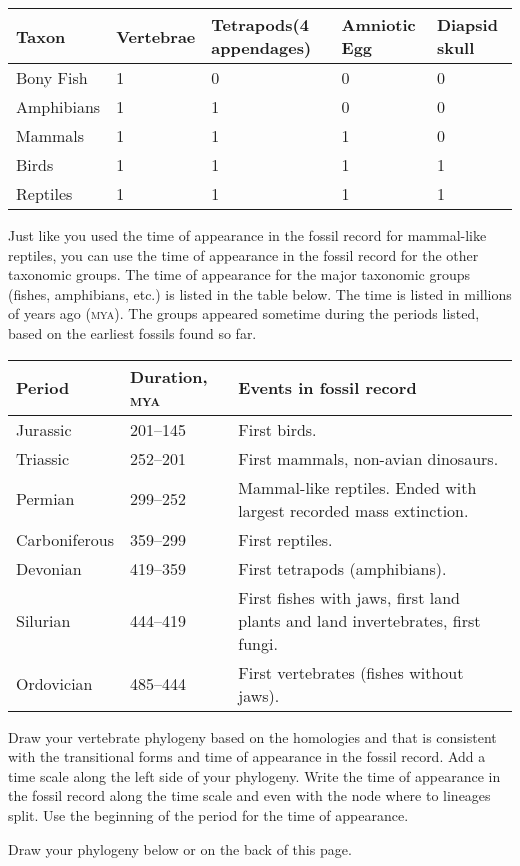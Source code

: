 \documentclass[12pt, hidelinks]{exam}
\begin{document}
\begin{questions}
\begin{longtable}[c]{@{}L{1in}C{1in}C{1in}C{1in}C{1in}@{}}
	\toprule
	Taxon 				&	Vertebrae	& Tetrapods\newline(4 appendages)	&	Amniotic Egg	& Diapsid skull \tabularnewline
	\midrule
	Bony Fish			& 1				&	0							& 0 						& 0 \tabularnewline
	Amphibians		& 1				&	1							& 0 						& 0 \tabularnewline
	Mammals			& 1				&	1							& 1 						& 0 \tabularnewline
	Birds					& 1				&	1							& 1 						& 1 \tabularnewline
	Reptiles			& 1				&	1							& 1 						& 1 \tabularnewline
	\bottomrule
\end{longtable}

\newpage

Just like you used the time of appearance in the fossil record for mammal-like reptiles, you can use the time of appearance in the fossil record for the other taxonomic groups. The time of appearance for the major taxonomic groups (fishes, amphibians, etc.) is listed in the table below. The time is listed in millions of years ago (\textsc{mya}). The groups appeared sometime during the periods listed, based on the earliest fossils found so far.

\begin{longtable}[c]{@{}L{1in}L{1.5in}L{2.5in}@{}}
\toprule
Period	& Duration, \textsc{mya} 	&	Events in fossil record \tabularnewline
\midrule
Jurassic			&	201–145	&	First birds.  \tabularnewline
Triassic				&	252–201	&	First mammals, non-avian dinosaurs. \tabularnewline
Permian			&	299–252	&	Mammal-like reptiles. Ended with largest recorded mass extinction. \tabularnewline
Carboniferous	&	359–299	&	First reptiles. \tabularnewline
Devonian			&	419–359	&	First tetrapods (amphibians). \tabularnewline
Silurian				&	444–419	&	First fishes with jaws, first land plants and land invertebrates, first fungi. \tabularnewline
Ordovician		&	485–444	&	First vertebrates (fishes without jaws). \tabularnewline
\bottomrule
\end{longtable}

\question
Draw your vertebrate phylogeny based on the homologies and that is consistent with the transitional forms and time of appearance in the fossil record. Add a time scale along the left side of your phylogeny. Write the time of appearance in the fossil record along the time scale and even with the node where to lineages split. Use the beginning of the period for the time of appearance.

Draw your phylogeny below or on the back of this page.

\end{questions}
\end{document}
